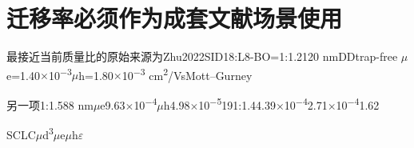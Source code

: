\section{{\cjkfont 迁移率必须作为成套文献场景使用}\allowbreak{}}\label{sec:38}
{\cjkfont 最接近当前质量比的原始来源为}\allowbreak{}Zhu\allowbreak{}2022\allowbreak{}SI\allowbreak{}D18:L8-BO=\allowbreak{}1:1.2\allowbreak{}120 nm\allowbreak{}DD\allowbreak{}trap-free \ensuremath{\mu}e=\allowbreak{}1.40\ensuremath{\times}10\textsuperscript{−3}\allowbreak{}\ensuremath{\mu}h=\allowbreak{}1.80\ensuremath{\times}10\textsuperscript{−3} cm\textsuperscript{2}/Vs\allowbreak{}Mott–Gurney\allowbreak{}
\par
{\cjkfont 另一项}\allowbreak{}1:1.5\allowbreak{}88 nm\allowbreak{}\ensuremath{\mu}e\allowbreak{}9.63\ensuremath{\times}10\textsuperscript{−4}\allowbreak{}\ensuremath{\mu}h\allowbreak{}4.98\ensuremath{\times}10\textsuperscript{−5}\allowbreak{}19\allowbreak{}1:1.4\allowbreak{}4.39\ensuremath{\times}10\textsuperscript{−4}\allowbreak{}2.71\ensuremath{\times}10\textsuperscript{−4}\allowbreak{}1.62\allowbreak{}
\par
SCLC\allowbreak{}\ensuremath{\mu}\allowbreak{}d\textsuperscript{3}\allowbreak{}\ensuremath{\mu}e\allowbreak{}\ensuremath{\mu}h\allowbreak{}\ensuremath{\varepsilon}\allowbreak{}
\par
